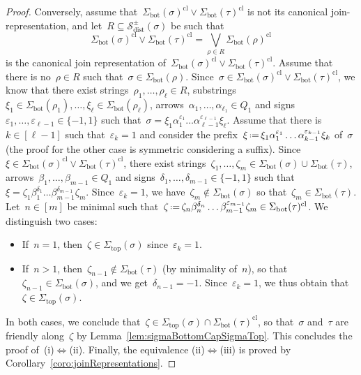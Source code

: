 \documentclass{amsart}
\theoremstyle{definition}
\newcommand{\eqdef}{\mbox{\,\raisebox{0.2ex}{\scriptsize\ensuremath{\mathrm:}}\ensuremath{=}\,}} %
\newcommand{\distinguishableStrings}{\mathcal{S}_\mathrm{dist}} %
\renewcommand{\top}{\mathrm{top}} %
\newcommand{\bottom}{\mathrm{bot}} %
\newcommand{\join}{\vee} %
\newcommand{\bigJoin}{\bigvee} %
\newcommand{\closure}[1]{#1^{\mathrm{cl}}} %
\begin{document}
\begin{proof}
Conversely, assume that~$\closure{\Sigma_\bottom(\sigma)} \join \closure{\Sigma_\bottom(\tau)}$ is not its canonical join-representation, and let~${R \subseteq \distinguishableStrings^\pm(\sigma)}$ be such that
\[
\closure{\Sigma_\bottom(\sigma)} \join \closure{\Sigma_\bottom(\tau)} = \bigJoin_{\rho \in R} \closure{\Sigma_\bottom(\rho)}
\]
is the canonical join representation of~$\closure{\Sigma_\bottom(\sigma)} \join \closure{\Sigma_\bottom(\tau)}$.
Assume that there is no~$\rho \in R$ such that~$\sigma \in \Sigma_\bottom(\rho)$.
Since~$\sigma \in \closure{\Sigma_\bottom(\sigma)} \join \closure{\Sigma_\bottom(\tau)}$, we know that there exist strings~$\rho_1, \dots, \rho_\ell \in R$, substrings~$\xi_1 \in \Sigma_\bottom(\rho_1), \dots, \xi_\ell \in \Sigma_\bottom(\rho_\ell)$, arrows~$\alpha_1, \dots, \alpha_{\ell_1} \in Q_1$ and signs~${\varepsilon_1, \dots, \varepsilon_{\ell-1} \in \{-1,1\}}$ such that~$\sigma = \xi_1 \alpha_1^{\varepsilon_1} \dots \alpha_{\ell-1}^{\varepsilon_{\ell-1}} \xi_\ell$.
Assume that there is~$k \in [\ell-1]$ such that~$\varepsilon_k = 1$ and consider the prefix~$\xi \eqdef \xi_1 \alpha_1^{\varepsilon_1} \dots \alpha_{k-1}^{\varepsilon_{k-1}} \xi_k$ of~$\sigma$ (the proof for the other case is symmetric considering a suffix).
Since~$\xi \in \closure{\Sigma_\bottom(\sigma)} \join \closure{\Sigma_\bottom(\tau)}$, there exist strings~$\zeta_1, \dots, \zeta_m \in \Sigma_\bottom(\sigma) \cup \Sigma_\bottom(\tau)$, arrows~$\beta_1, \dots, \beta_{m-1} \in Q_1$ and signs~$\delta_1, \dots, \delta_{m-1} \in \{-1,1\}$ such that~$\xi = \zeta_1 \beta_1^{\delta_1} \dots \beta_{m-1}^{\delta_{m-1}} \zeta_m$.
Since~$\varepsilon_k = 1$, we have~$\zeta_m \notin \Sigma_\bottom(\sigma)$ so that~$\zeta_m \in \Sigma_\bottom(\tau)$.
Let~$n \in [m]$ be minimal such that~$\zeta \eqdef \zeta_n \beta_n^{\delta_n} \dots \beta_{m-1}^{\varepsilon_{m-1}} \zeta_m \in \closure{\Sigma_\bottom(\tau)}$.
We distinguish two cases:
\begin{itemize}
\item If~$n = 1$, then~$\zeta \in \Sigma_\top(\sigma)$ since~$\varepsilon_k = 1$.
\item If~$n > 1$, then~$\zeta_{n-1} \notin \Sigma_\bottom(\tau)$ (by minimality of~$n$), so that~$\zeta_{n-1} \in \Sigma_\bottom(\sigma)$, and we get~$\delta_{n-1} = -1$. Since~$\varepsilon_k = 1$, we thus obtain that~$\zeta \in \Sigma_\top(\sigma)$.
\end{itemize}
In both cases, we conclude that~$\zeta \in \Sigma_\top(\sigma) \cap \closure{\Sigma_\bottom(\tau)}$, so that~$\sigma$ and~$\tau$ are friendly along~$\zeta$ by Lemma~\ref{lem:sigmaBottomCapSigmaTop}.
This concludes the proof of~(i)$\iff$(ii). Finally, the equivalence (ii)$\iff$(iii) is proved by Corollary~\ref{coro:joinRepresentations}.
\end{proof}
\end{document}

